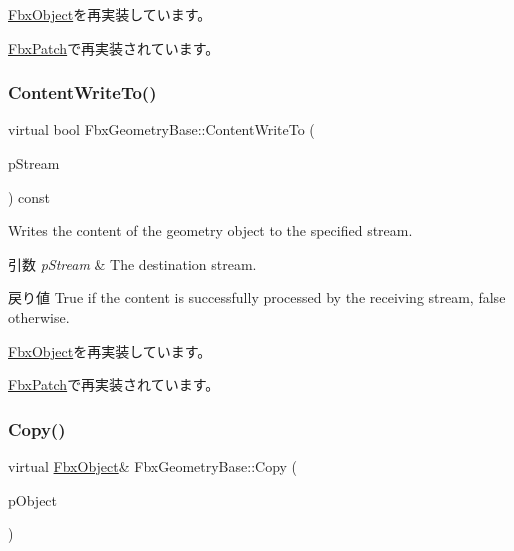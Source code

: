 \hyperlink{class_fbx_object_aeb4255bda633e1986730748758a7cf6c}{Fbx\+Object}を再実装しています。



\hyperlink{class_fbx_patch_ad1aac4a2e0e820f27ff9a0123ba5756e}{Fbx\+Patch}で再実装されています。

\mbox{\label{class_fbx_geometry_base_a7b80ccbcd2b15bbedbe7dd7e0739a3b3}} 
\subsubsection{\texorpdfstring{Content\+Write\+To()}{ContentWriteTo()}}
{\footnotesize\ttfamily virtual bool Fbx\+Geometry\+Base\+::\+Content\+Write\+To (\begin{DoxyParamCaption}\item[{\hyperlink{class_fbx_stream}{Fbx\+Stream} \&}]{p\+Stream }\end{DoxyParamCaption}) const\hspace{0.3cm}{\ttfamily [virtual]}}

Writes the content of the geometry object to the specified stream. 
\begin{DoxyParams}{引数}
{\em p\+Stream} & The destination stream. \\
\hline
\end{DoxyParams}
\begin{DoxyReturn}{戻り値}
{\ttfamily True} if the content is successfully processed by the receiving stream, {\ttfamily false} otherwise. 
\end{DoxyReturn}


\hyperlink{class_fbx_object_ab8a59df9233cdfeaae05e5b6d15f5101}{Fbx\+Object}を再実装しています。



\hyperlink{class_fbx_patch_a2ecc16ad355ca521c921ec3731719585}{Fbx\+Patch}で再実装されています。

\mbox{\label{class_fbx_geometry_base_a2c3754831338327259c35caebbf379d3}} 
\subsubsection{\texorpdfstring{Copy()}{Copy()}}
{\footnotesize\ttfamily virtual \hyperlink{class_fbx_object}{Fbx\+Object}\& Fbx\+Geometry\+Base\+::\+Copy (\begin{DoxyParamCaption}\item[{const \hyperlink{class_fbx_object}{Fbx\+Object} \&}]{p\+Object }\end{DoxyParamCaption})\hspace{0.3cm}{\ttfamily [virtual]}}

